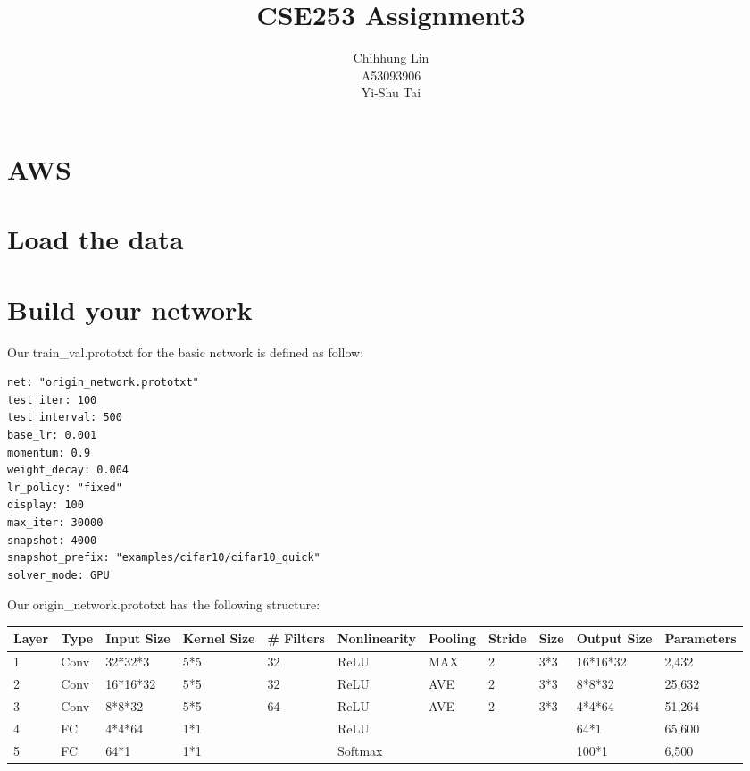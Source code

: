 \documentclass{article} %
\title{CSE253 Assignment3}
\author{
Chihhung Lin\\
A53093906\\
\And
Yi-Shu Tai \\
}
\begin{document}
\maketitle
\section{AWS}
\section{Load the data}
\section{Build your network}
Our train\_val.prototxt for the basic network is defined as follow:
\begin{lstlisting}
net: "origin_network.prototxt"
test_iter: 100 
test_interval: 500 
base_lr: 0.001
momentum: 0.9 
weight_decay: 0.004
lr_policy: "fixed"
display: 100 
max_iter: 30000
snapshot: 4000
snapshot_prefix: "examples/cifar10/cifar10_quick"
solver_mode: GPU 
\end{lstlisting}
Our origin\_network.prototxt has the following structure:
\begin{table}[H]
    \begin{tabular}{|l|l|l|l|l|l|l|l|l|l|l|}
    \hline
    Layer & Type & Input Size & Kernel Size & \# Filters & Nonlinearity & Pooling & Stride & Size & Output Size & Parameters \\ \hline
    1     & Conv & 32*32*3    & 5*5         & 32         & ReLU         & MAX     & 2      & 3*3  & 16*16*32    & 2,432      \\ \hline
    2     & Conv & 16*16*32   & 5*5         & 32         & ReLU         & AVE     & 2      & 3*3  & 8*8*32      & 25,632     \\ \hline
    3     & Conv & 8*8*32     & 5*5         & 64         & ReLU         & AVE     & 2      & 3*3  & 4*4*64      & 51,264     \\ \hline
    4     & FC   & 4*4*64     & 1*1         & ~          & ReLU         & ~       & ~      & ~    & 64*1        & 65,600     \\ \hline
    5     & FC   & 64*1       & 1*1         & ~          & Softmax      & ~       & ~      & ~    & 100*1       & 6,500      \\ \hline
    \end{tabular}
\end{table}
\end{document}

